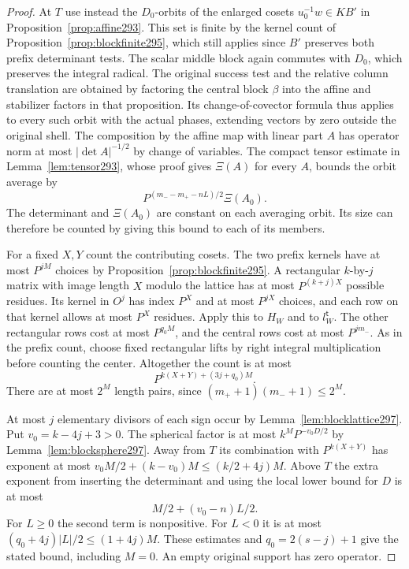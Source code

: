 \documentclass[a4paper,11pt]{article}
\theoremstyle{definition}
\theoremstyle{remark}
\numberwithin{equation}{section}
\begin{document}
\begin{proof}
At \(T\) use instead the \(D_0\)-orbits of the enlarged
cosets \(u_0^{-1}w\in KB'\) in Proposition~\ref{prop:affine293}.
This set is finite by the kernel count of
Proposition~\ref{prop:blockfinite295}, which still applies
since \(B'\) preserves both prefix determinant tests.
The scalar middle block again commutes with \(D_0\), which
preserves the integral radical. The original success test and
the relative column translation are obtained by factoring the
central block \(\beta\) into the affine and stabilizer factors
in that proposition. Its change-of-covector formula thus applies
to every such orbit with the actual phases, extending vectors by
zero outside the original shell. The composition by the affine
map with linear part \(A\) has operator norm at most
\(|\det A|^{-1/2}\) by change of variables. The compact
tensor estimate in Lemma~\ref{lem:tensor293}, whose proof
gives \(\Xi(A)\) for every \(A\), bounds the orbit average by
\[
              P^{(m_- -m_+-nL)/2}\Xi(A_0).
\]
The determinant and \(\Xi(A_0)\) are constant on each
averaging orbit. Its size can therefore be counted by giving
this bound to each of its members.

For a fixed \(X,Y\) count the contributing cosets. The two
prefix kernels have at most \(P^{jM}\) choices by
Proposition~\ref{prop:blockfinite295}. A rectangular \(k\)-by-\(j\)
matrix with image length \(X\) modulo the lattice has at most
\(P^{(k+j)X}\) possible residues. Its kernel in \(O^j\) has
index \(P^X\) and at most \(P^{jX}\) choices, and each row
on that kernel allows at most \(P^X\) residues. Apply this
to \(H_W\) and to \(l_W^{\mathsf t}\). The other rectangular
rows cost at most \(P^{q_0M}\), and the central rows cost
at most \(P^{j m_-}\). As in the prefix count, choose fixed
rectangular lifts by right integral multiplication before
counting the center. Altogether the count is at most
\[
                       P^{k(X+Y)+(3j+q_0)M}.
\]
There are at most \(2^M\) length pairs, since
\((m_++1)(m_-+1)\le2^M\).

At most \(j\) elementary divisors of each sign occur by
Lemma~\ref{lem:blocklattice297}. Put \(v_0=k-4j+3>0\).
The spherical factor is at most
\(k^M P^{-v_0D/2}\) by Lemma~\ref{lem:blocksphere297}.
Away from \(T\) its combination with \(P^{k(X+Y)}\) has
exponent at most \(v_0M/2+(k-v_0)M\le(k/2+4j)M\).
Above \(T\) the extra exponent from inserting the determinant
and using the local lower bound for \(D\) is at most
\[
                  M/2+(v_0-n)L/2 .
\]
For \(L\ge0\) the second term is nonpositive. For \(L<0\)
it is at most \((q_0+4j)|L|/2\le(1+4j)M\).
These estimates and \(q_0=2(s-j)+1\) give the stated
bound, including \(M=0\). An empty original support has
zero operator.
\end{proof}
\end{document}
